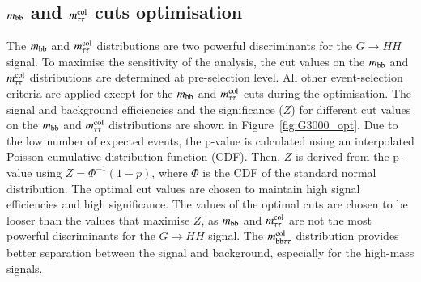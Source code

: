    \subsection{$m_\mathrm{bb}$ and $m_\mathrm{\tau\tau}^\mathrm{col}$ cuts optimisation}
        The $m_\mathrm{bb}$ and $m_\mathrm{\tau\tau}^\mathrm{col}$ distributions are two powerful discriminants for the $G \rightarrow HH$ signal. 
        To maximise the sensitivity of the analysis, the cut values on the $m_\mathrm{bb}$ and $m_\mathrm{\tau\tau}^\mathrm{col}$ distributions are determined at pre-selection level.
        All other event-selection criteria are applied except for the $m_\mathrm{bb}$ and $m_\mathrm{\tau\tau}^\mathrm{col}$ cuts during the optimisation. 
        The signal and background efficiencies and the significance ($Z$) for different cut values on the 
        $m_\mathrm{bb}$ and $m_\mathrm{\tau\tau}^\mathrm{col}$ distributions are shown in Figure~\ref{fig:G3000_opt}.
        Due to the low number of expected events, the p-value is calculated using an interpolated Poisson 
        cumulative distribution function (CDF). 
        Then, $Z$ is derived from the p-value using $Z = \Phi^{-1}(1 - p)$, where $\Phi$ is the CDF of the standard normal distribution. 
        The optimal cut values are chosen to maintain high signal efficiencies and high significance. 
        The values of the optimal cuts are chosen to be looser than the values that maximise $Z$, 
        as $m_\mathrm{bb}$ and $m_\mathrm{\tau\tau}^\mathrm{col}$ are not the most powerful discriminants for the $G \rightarrow HH$ signal. 
        The $m_\mathrm{bb\tau\tau}^\mathrm{col}$ distribution provides better separation between the signal and background, especially for the high-mass signals.

